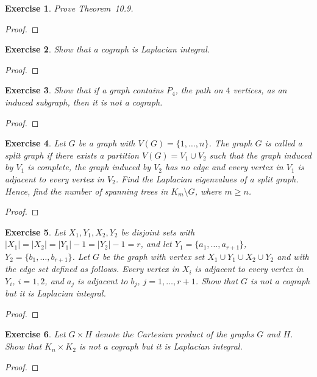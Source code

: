 \documentclass[11pt]{article}
\newtheorem{exercise}{Exercise}[section]
\theoremstyle{definition}
\begin{document}
\begin{exercise}
Prove Theorem~10.9.
\end{exercise}
\begin{proof}
\end{proof}

\begin{exercise}
Show that a cograph is Laplacian integral.
\end{exercise}
\begin{proof}
\end{proof}

\begin{exercise}
Show that if a graph contains $P_4$, the path on $4$ vertices, as an induced subgraph,
then it is not a cograph.
\end{exercise}
\begin{proof}
\end{proof}

\begin{exercise}
Let $G$ be a graph with $V(G)=\{1,\ldots,n\}$. The graph $G$ is called a split graph if there
exists a partition $V(G)=V_1\cup V_2$ such that the graph induced by $V_1$ is complete, the graph
induced by $V_2$ has no edge and every vertex in $V_1$ is adjacent to every vertex in $V_2$.
Find the Laplacian eigenvalues of a split graph. Hence, find the number of spanning trees in
$K_m\setminus G$, where $m\ge n$.
\end{exercise}
\begin{proof}
\end{proof}

\begin{exercise}
Let $X_1,Y_1,X_2,Y_2$ be disjoint sets with $|X_1|=|X_2|=|Y_1|-1=|Y_2|-1=r$, and let
$Y_1=\{a_1,\ldots,a_{r+1}\}$, $Y_2=\{b_1,\ldots,b_{r+1}\}$.
Let $G$ be the graph with vertex set $X_1\cup Y_1\cup X_2\cup Y_2$ and with the edge set defined
as follows. Every vertex in $X_i$ is adjacent to every vertex in $Y_i$, $i=1,2$, and $a_j$ is
adjacent to $b_j$, $j=1,\ldots,r+1$. Show that $G$ is not a cograph but it is Laplacian integral.
\end{exercise}
\begin{proof}
\end{proof}

\begin{exercise}
Let $G\times H$ denote the Cartesian product of the graphs $G$ and $H$. Show that
$K_n\times K_2$ is not a cograph but it is Laplacian integral.
\end{exercise}
\begin{proof}
\end{proof}
\end{document}
